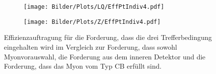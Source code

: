 %
\begin{figure}
\begin{subfigure}[t]{0.55\textwidth}
  \texttt{[image: Bilder/Plots/LQ/EffPtIndiv4.pdf]}
  \label{EffPtIndiv4LQ}
\end{subfigure}
  \begin{subfigure}[t]{0.55\textwidth}
  \texttt{[image: Bilder/Plots/Z/EffPtIndiv4.pdf]}
  \label{EffPtIndiv4Z}
\end{subfigure}
\caption{Effizienzauftragung für die Forderung, dass die drei Trefferbedingung eingehalten wird im Vergleich zur Forderung, dass sowohl Myonvorauswahl, die Forderung aus dem inneren Detektor und die Forderung, dass das Myon vom Typ CB erfüllt sind.}
\label{EffPtIndiv4}
\end{figure}
